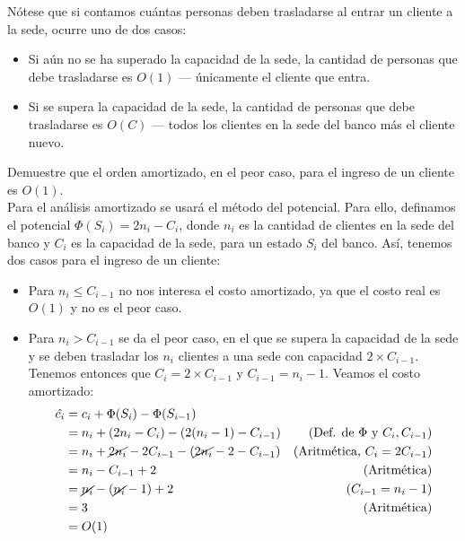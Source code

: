 \documentclass[letterpaper, 12pt]{article}
\begin{document}
\begin{enumerate}
Nótese que si contamos cuántas personas deben trasladarse al entrar un cliente a la sede, ocurre uno de dos casos:

\begin{itemize}
    \item Si aún no se ha superado la capacidad de la sede, la cantidad de personas que debe trasladarse es $O(1)$ — únicamente el cliente que entra.
    \item Si se supera la capacidad de la sede, la cantidad de personas que debe trasladarse es $O(C)$ — todos los clientes en la sede del banco más el cliente nuevo.
\end{itemize}

Demuestre que el orden amortizado, en el peor caso, para el ingreso de un cliente es $O(1)$. \\

Para el análisis amortizado se usará el método del potencial. Para ello, definamos el potencial $\Phi(S_i) = 2n_i - C_i$, donde $n_i$ es la cantidad de clientes en la sede del banco y $C_i$ es la capacidad de la sede, para un estado $S_i$ del banco. Así, tenemos dos casos para el ingreso de un cliente:

\begin{itemize}
    \item Para $n_i \leq C_{i-1}$ no nos interesa el costo amortizado, ya que el costo real es $O(1)$ y no es el peor caso.
    \item Para $n_i > C_{i-1}$ se da el peor caso, en el que se supera la capacidad de la sede y se deben trasladar los $n_i$ clientes a una sede con capacidad $2 \times C_{i-1}$. Tenemos entonces que $C_i = 2 \times C_{i-1}$ y $C_{i-1} = n_i - 1$. Veamos el costo amortizado:
    \begin{align*}
        \hat{c_i} &= c_i + \Phi(S_i) - \Phi(S_{i-1}) &\\
        &= n_i + (2n_i - C_i) - (2(n_i - 1) - C_{i-1}) & (\text{Def. de } \Phi \text{ y } C_i, C_{i-1}) \\
        &= n_i + \cancel{2n_i} - 2C_{i-1} - (\cancel{2n_i} - 2 - C_{i-1}) & (\text{Aritmética, } C_i = 2C_{i-1}) \\
        &= n_i - C_{i-1} + 2 & (\text{Aritmética}) \\
        &= \cancel{n_i} - (\cancel{n_i} - 1) + 2 & (C_{i-1} = n_i - 1) \\
        &= 3 & (\text{Aritmética}) \\
        &= O(1)
    \end{align*}


\end{itemize}
\end{enumerate}
\end{document}
